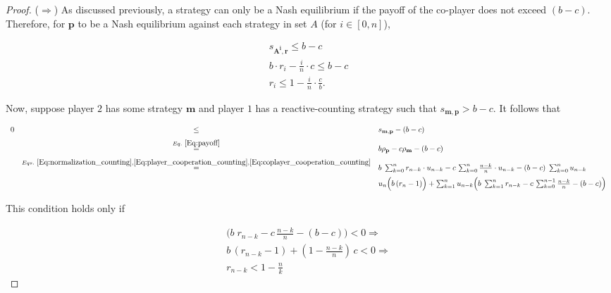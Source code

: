 \documentclass[11pt]{article}
\theoremstyle{definition}
\begin{document}
\begin{proof}
($\Rightarrow$) As discussed previously, a strategy can only be a Nash equilibrium if the payoff of the co-player does not exceed $(b - c)$. Therefore, for $\mathbf{p}$ to be a Nash equilibrium against each strategy in set $A$ (for $i \in [0, n]$),

\begin{align*}
  s_{\mathbf{A^{i}}, \mathbf{r}} \leq b - c \\
  b \cdot r_i - \frac{i}{n} \cdot c \leq   b - c \\
  r_i \leq 1 - \frac{i}{n} \cdot \frac{c}{b}.
\end{align*}

Now, suppose player $2$ has some strategy $\mathbf{m}$ and player $1$ has a reactive-counting strategy such that $s_{\mathbf{m}, \mathbf{p}} > b - c$. It follows that

\begin{equation}
\begin{array}{rcl}
0 &\le & s_{\mathbf{m}, \mathbf{p}}-(b - c)\\[0.2cm]
&\stackrel{Eq.~\eqref{Eq:payoff}}{=} & b\rho_\mathbf{p} - c\rho_\mathbf{m} - (b - c)\\[0.2cm]
&\stackrel{Eqs.~\eqref{Eq:normalization_counting}, \eqref{Eq:player_cooperation_counting}, \eqref{Eq:coplayer_cooperation_counting}}{=} & b\; \sum_{k=0}^{n} r_{n - k} \cdot u_{n - k} - c\, \sum_{k=0}^{n} \frac{n - k}{n} \cdot u_{n - k} - (b - c)\; \sum_{k=0}^{n} u_{n - k}\\[0.2cm]
& &  u_{n} \Big(b\, (r_n - 1) \Big) +  \sum_{k=1}^{n} u_{n - k} \Big(b\; \sum_{k=1}^{n} r_{n - k} - c\, \sum_{k=0}^{n - 1} \frac{n - k}{n} - (b - c)\Big)
\end{array}
\end{equation}

This condition holds only if

\begin{align*}
  \Big(b\; r_{n - k} - c\, \frac{n - k}{n} - (b - c)\Big) < 0 \Rightarrow \\ 
  b \, (r_{n - k} - 1) + (1 - \frac{n - k}{n})\, c < 0 \Rightarrow \\ 
  r_{n - k} < 1 - \frac{n}{k} 
\end{align*}

\end{proof}

~\\

\end{document}
